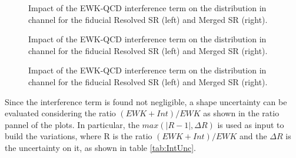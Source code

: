 \begin{figure}[ht]
    \centering
    \caption{Impact of the EWK-QCD interference term on the \mjjtag distribution in \zlep channel for 
                the fiducial Resolved SR (left) and Merged SR (right).}
    \label{fig:EWKQCDInt_Mjj_0lep}
\end{figure}

\begin{figure}[ht]
    \centering
    \caption{Impact of the EWK-QCD interference term on the \mjjtag distribution in \olep channel for 
                the fiducial Resolved SR (left) and Merged SR (right).}
    \label{fig:EWKQCDInt_Mjj_1lep}
\end{figure}

\begin{figure}[ht]
    \centering
    \caption{Impact of the EWK-QCD interference term on the \mjjtag distribution in \tlep channel for 
                the fiducial Resolved SR (left) and Merged SR (right).}
    \label{fig:EWKQCDInt_Mjj_2lep}
\end{figure}

Since the interference term is found not negligible, a shape uncertainty can be evaluated considering 
the ratio $(EWK+Int) / EWK$ as shown in the ratio pannel of the plots.
In particular, the $max(|R-1|, \Delta R)$ is used as input to build the variations, where R is the ratio
$(EWK+Int) / EWK$ and the $\Delta R$ is the uncertainty on it, as shown in table \ref{tab:IntUnc}.


